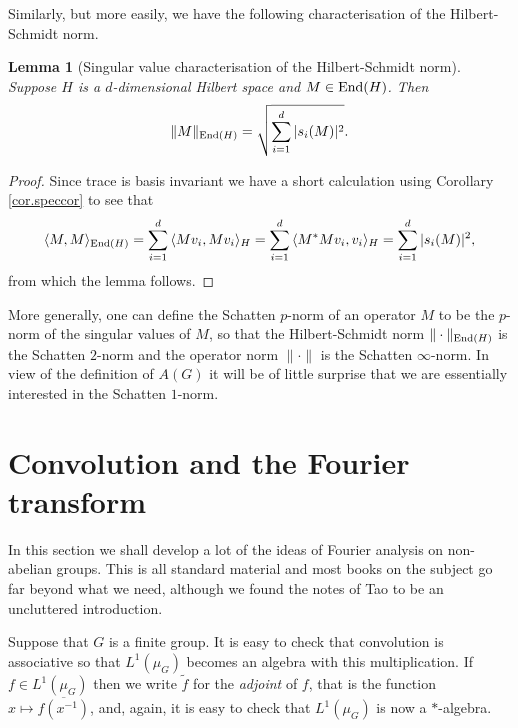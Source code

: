 \documentclass[12pt]{amsart}
\numberwithin{equation}{section}
\theoremstyle{plain}
\newtheorem{lemma}[subsection]{Lemma}
\theoremstyle{definition}
\providecommand{\End}{\mathop{\rm End}\nolimits}
\begin{document}
Similarly, but more easily, we have the following characterisation of the Hilbert-Schmidt norm.
\begin{lemma}[Singular value characterisation of the Hilbert-Schmidt norm]
Suppose $H$ is a $d$-dimensional Hilbert space and $M \in \End(H)$. Then
\begin{equation*}
\|M\|_{\End(H)} = \sqrt{\sum_{i=1}^d{|s_i(M)|^2}}.
\end{equation*}
\end{lemma}
\begin{proof}
Since trace is basis invariant we have a short calculation using Corollary \ref{cor.speccor} to see that
\begin{equation*}
\langle M,M\rangle_{\End(H)} = \sum_{i=1}^d{\langle Mv_i,Mv_i\rangle_H} = \sum_{i=1}^d{\langle M^*Mv_i,v_i\rangle_H} = \sum_{i=1}^d{|s_i(M)|^2},
\end{equation*}
from which the lemma follows.
\end{proof}
More generally, one can define the Schatten $p$-norm of an operator $M$ to be the $p$-norm of the singular values of $M$, so that the Hilbert-Schmidt norm $\|\cdot\|_{\End(H)}$ is the Schatten $2$-norm and the operator norm $\|\cdot\|$ is the Schatten $\infty$-norm.  In view of the definition of $A(G)$ it will be of little surprise that we are essentially interested in the Schatten $1$-norm.

\section{Convolution and the Fourier transform}\label{sec.ft}

In this section we shall develop a lot of the ideas of Fourier analysis on non-abelian groups.  This is all standard material and most books on the subject go far beyond what we need, although we found the notes \cite{TCT} of Tao to be an uncluttered introduction.

Suppose that $G$ is a finite group.  It is easy to check that convolution is associative so that $L^1(\mu_G)$ becomes an algebra with this multiplication.  If $f \in L^1(\mu_G)$ then we write $\tilde{f}$ for the \emph{adjoint} of $f$, that is the function $x \mapsto \overline{f(x^{-1})}$, and, again, it is easy to check that $L^1(\mu_G)$ is now a $*$-algebra.
\end{document}
